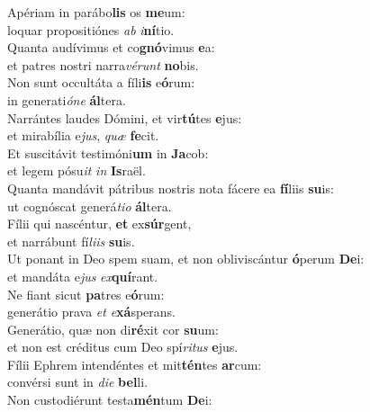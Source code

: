 \evenverse Apériam in parábo\textbf{lis} os \textbf{me}um:~\*\\
\evenverse loquar propositiónes \textit{ab} \textit{i}\textbf{ní}tio.\\
\oddverse Quanta audívimus et co\textbf{gnó}vimus \textbf{e}a:~\*\\
\oddverse et patres nostri narra\textit{vé}\textit{runt} \textbf{no}bis.\\
\evenverse Non sunt occultáta a fíli\textbf{is} e\textbf{ó}rum:~\*\\
\evenverse in generati\textit{ó}\textit{ne} \textbf{ál}tera.\\
\oddverse Narrántes laudes Dómini, et vir\textbf{tú}tes \textbf{e}jus:~\*\\
\oddverse et mirabília e\textit{jus}, \textit{quæ} \textbf{fe}cit.\\
\evenverse Et suscitávit testimóni\textbf{um} in \textbf{Ja}cob:~\*\\
\evenverse et legem pósu\textit{it} \textit{in} \textbf{Is}raël.\\
\oddverse Quanta mandávit pátribus nostris nota fácere ea \textbf{fí}liis \textbf{su}is:~\*\\
\oddverse ut cognóscat generá\textit{ti}\textit{o} \textbf{ál}tera.\\
\evenverse Fílii qui nascéntur, \textbf{et} ex\textbf{súr}gent,~\*\\
\evenverse et narrábunt fí\textit{li}\textit{is} \textbf{su}is.\\
\oddverse Ut ponant in Deo spem suam, et non obliviscántur \textbf{ó}perum \textbf{De}i:~\*\\
\oddverse et mandáta e\textit{jus} \textit{ex}\textbf{quí}rant.\\
\evenverse Ne fiant sicut \textbf{pa}tres e\textbf{ó}rum:~\*\\
\evenverse generátio prava \textit{et} \textit{e}\textbf{xá}sperans.\\
\oddverse Generátio, quæ non di\textbf{ré}xit cor \textbf{su}um:~\*\\
\oddverse et non est créditus cum Deo spí\textit{ri}\textit{tus} \textbf{e}jus.\\
\evenverse Fílii Ephrem intendéntes et mit\textbf{tén}tes \textbf{ar}cum:~\*\\
\evenverse convérsi sunt in \textit{di}\textit{e} \textbf{bel}li.\\
\oddverse Non custodiérunt testa\textbf{mén}tum \textbf{De}i:~\*\\
